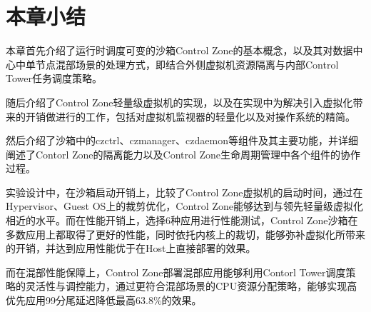 \section{本章小结}

本章首先介绍了运行时调度可变的沙箱Control Zone的基本概念，以及其对数据中心中单节点混部场景的处理方式，即结合外侧虚拟机资源隔离与内部Control Tower任务调度策略。

随后介绍了Control Zone轻量级虚拟机的实现，以及在实现中为解决引入虚拟化带来的开销做进行的工作，包括对虚拟机监视器的轻量化以及对操作系统的精简。

然后介绍了沙箱中的czctrl、czmanager、czdaemon等组件及其主要功能，并详细阐述了Contorl Zone的隔离能力以及Control Zone生命周期管理中各个组件的协作过程。

实验设计中，在沙箱启动开销上，比较了Control Zone虚拟机的启动时间，通过在Hypervisor、Guest OS上的裁剪优化，Control Zone能够达到与领先轻量级虚拟化相近的水平。而在性能开销上，选择6种应用进行性能测试，Control Zone沙箱在多数应用上都取得了更好的性能，同时依托内核上的裁切，能够弥补虚拟化所带来的开销，并达到应用性能优于在Host上直接部署的效果。

而在混部性能保障上，Control Zone部署混部应用能够利用Contorl Tower调度策略的灵活性与调控能力，通过更符合混部场景的CPU资源分配策略，能够实现高优先应用99分尾延迟降低最高63.8\%的效果。